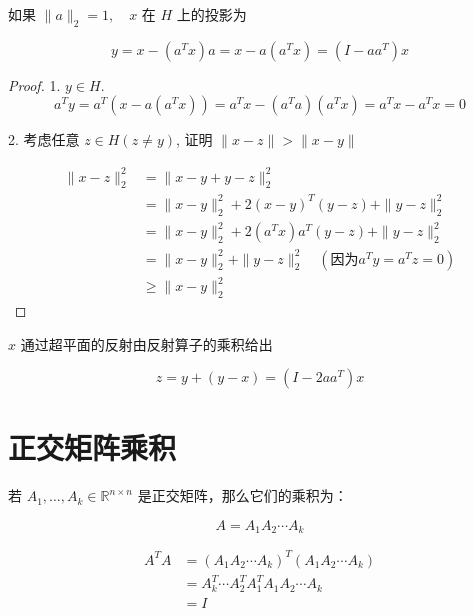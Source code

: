 \begin{theorem}
    如果 $ \|a\|_{2}=1, \quad x $ 在 $ H $ 上的投影为

    \begin{equation} y=x-\left(a^{T} x\right) a=x-a\left(a^{T} x\right)=\left(I-a a^{T}\right) x \end{equation}
\end{theorem}

\begin{proof}
1. $ y \in H $.
\begin{equation}
a^{T} y=a^{T}\left(x-a\left(a^{T} x\right)\right)=a^{T} x-\left(a^{T} a\right)\left(a^{T} x\right)=a^{T} x-a^{T} x=0
\end{equation}

2. 考虑任意 $ z \in H(z \neq y) $, 证明 $ \|x-z\|>\|x-y\| $

\begin{equation} \begin{aligned}\|x-z\|_{2}^{2} &=\|x-y+y-z\|_{2}^{2} 
    \\ &=\|x-y\|_{2}^{2}+2(x-y)^{T}(y-z)+\|y-z\|_{2}^{2} 
    \\ &=\|x-y\|_{2}^{2}+2\left(a^{T} x\right) a^{T}(y-z)+\|y-z\|_{2}^{2}
    \\ &=\|x-y\|_{2}^{2}+\|y-z\|_{2}^{2} \quad (因为  a^{T} y=a^{T} z = 0)
    \\ &\ge \|x-y\|_{2}^{2}
\end{aligned} \end{equation}

\end{proof}

\begin{corollary}
    $ x $ 通过超平面的反射由反射算子的乘积给出

    \begin{equation} z=y+(y-x)=\left(I-2 a a^{T}\right) x \end{equation}
\end{corollary}

\section{正交矩阵乘积}

若 $ A_{1}, \ldots, A_{k} \in \mathbb{R}^{n \times n} $ 是正交矩阵，那么它们的乘积为：

\begin{equation} A=A_{1} A_{2} \cdots A_{k} \end{equation}

\begin{corollary}[正交矩阵乘积的正交性]

\begin{equation}\begin{aligned}
    A^{T} A&=\left(A_{1} A_{2} \cdots A_{k}\right)^{T}\left(A_{1} A_{2} \cdots A_{k}\right)\\
    &=A_{k}^{T} \cdots A_{2}^{T} A_{1}^{T} A_{1} A_{2} \cdots A_{k}\\
    &=I
\end{aligned}\end{equation}

\end{corollary}



